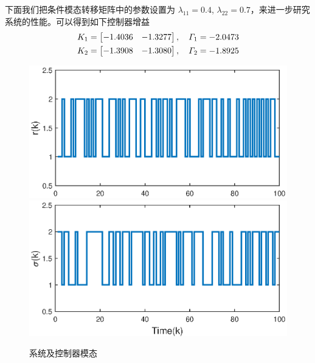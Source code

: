下面我们把条件模态转移矩阵中的参数设置为 $\lambda_{11}=0.4$, $\lambda_{22}=0.7$，来进一步研究系统的性能。可以得到如下控制器增益
\begin{equation}\notag
\begin{aligned}
K_{1}=\begin{bmatrix}
-1.4036&-1.3277
\end{bmatrix},\quad
\varGamma_{1}=-2.0473 \\
K_{2}=\begin{bmatrix}
-1.3908&-1.3080
\end{bmatrix},\quad
\varGamma_{2}=-1.8925
\end{aligned}
\end{equation}

\begin{figure}[!htb]
	\centering\includegraphics[scale=0.6]{./figures/lure_system/mode_p5.eps}\\ 
	\centering\includegraphics[scale=0.6]{./figures/lure_system/mode_k5.eps}\\ 
	\caption{系统及控制器模态}
	\label{fig2}
\end{figure}

